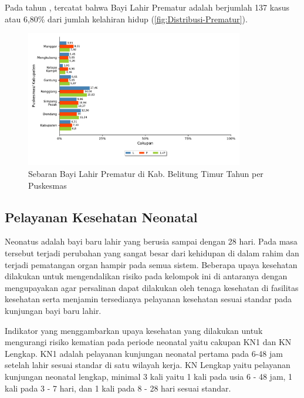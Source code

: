 Pada tahun \tP, tercatat bahwa Bayi Lahir Prematur adalah berjumlah
137 kasus atau 6,80\% dari jumlah kelahiran hidup (\autoref{fig:Distribusi-Prematur}).

\begin{figure}[H]
	\centering
	\includegraphics[width=0.85\textwidth]{bab_05/bab_05_13a_Prematur}
	\caption{Sebaran Bayi Lahir Prematur di Kab. Belitung Timur Tahun \tP per Puskesmas}
	\label{fig:Distribusi-Prematur}
\end{figure}

\subsection{Pelayanan Kesehatan Neonatal}
Neonatus adalah bayi baru lahir yang berusia sampai dengan 28 hari.
Pada masa tersebut terjadi perubahan yang sangat besar dari kehidupan
di dalam rahim dan terjadi pematangan organ hampir pada semua sistem.
Beberapa upaya kesehatan dilakukan untuk mengendalikan risiko pada
kelompok ini di antaranya dengan mengupayakan agar persalinan dapat
dilakukan oleh tenaga kesehatan di fasilitas kesehatan serta menjamin
tersedianya pelayanan kesehatan sesuai standar pada kunjungan bayi
baru lahir.

Indikator yang menggambarkan upaya kesehatan yang dilakukan untuk
mengurangi risiko kematian pada periode neonatal yaitu cakupan KN1
dan KN Lengkap. KN1 adalah pelayanan kunjungan neonatal pertama pada
6-48 jam setelah lahir sesuai standar di satu wilayah kerja. KN Lengkap
yaitu pelayanan kunjungan neonatal lengkap, minimal 3 kali yaitu 1
kali pada usia 6 - 48 jam, 1 kali pada 3 - 7 hari, dan 1 kali pada
8 - 28 hari sesuai standar.


